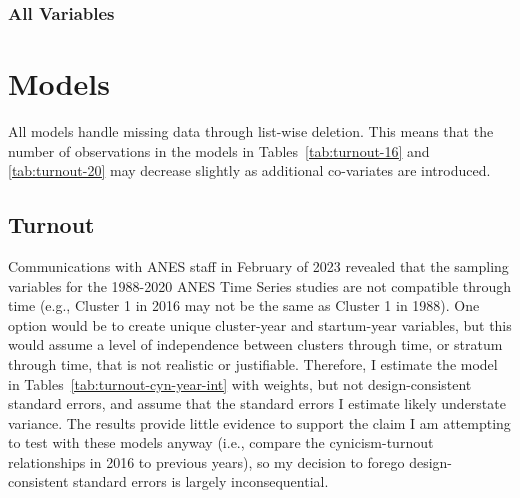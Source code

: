 \documentclass[12pt]{article}
\begin{document}
\begin{appendices}
\begin{refsection}
   
    
\clearpage



\subsubsection{All Variables}\label{si:all-vars} %

\clearpage















\section{Models}\label{si:mods}
All models handle missing data through list-wise deletion. This means that the number of observations in the models in Tables~\ref{tab:turnout-16} and \ref{tab:turnout-20} may decrease slightly as additional co-variates are introduced. 

\subsection{Turnout}\label{si:mods:turnout}



Communications with ANES staff in February of 2023 revealed that the sampling variables for the 1988-2020 ANES Time Series studies are not compatible through time (e.g., Cluster 1 in 2016 may not be the same as Cluster 1 in 1988). One option would be to create unique cluster-year and startum-year variables, but this would assume a level of independence between clusters through time, or stratum through time, that is not realistic or justifiable. Therefore, I estimate the model in Tables~\ref{tab:turnout-cyn-year-int} with weights, but not design-consistent standard errors, and assume that the standard errors I estimate likely understate variance. The results provide little evidence to support the claim I am attempting to test with these models anyway (i.e., compare the cynicism-turnout relationships in 2016 to previous years), so my decision to forego design-consistent standard errors is largely inconsequential. 


\end{refsection}
\end{appendices}
\end{document}
